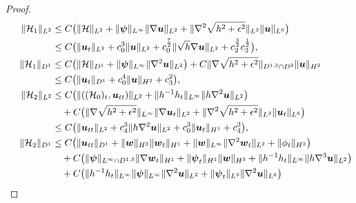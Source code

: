\documentclass[11pt,reqno]{amsart}
\numberwithin{rk}{section}
\numberwithin{prop}{section}
\numberwithin{mydef}{section}
\numberwithin{lem}{section}
\numberwithin{equation}{section}
\numberwithin{thm}{section}
\begin{document}
\begin{proof}
\begin{align}
&\hspace{5.5mm}\begin{aligned}
\|\mathcal{H}_1\|_{L^2}&\leq  C\big(\|\mathcal{H}\|_{L^2}+\|\boldsymbol{\psi}\|_{L^\infty} \|\nabla \boldsymbol{u}\|_{L^2}
+\|\nabla^2 \sqrt{h^2+\epsilon^2}\|_{L^3} 
\|\boldsymbol{u}\|_{L^6}\big)\notag\\
& \leq  C\big(\|\boldsymbol{u}_t\|_{L^2}+c_0^{3}\| \boldsymbol{u}\|_{L^2}+ c_0^{\frac{7}{2}}\|\sqrt{h}\nabla \boldsymbol{u}\|_{L^2}+c_2^{\frac{3}{2}}c_3^{\frac{1}{2}}\big),\notag
\end{aligned}\\
&\hspace{5mm}\begin{aligned}
\|\mathcal{H}_1\|_{D^1}
&\leq  C\big(\|\mathcal{H}\|_{D^1} +\|\boldsymbol{\psi}\|_{L^\infty} \|\nabla^2 \boldsymbol{u}\|_{L^2}\big)  +C \|\nabla \sqrt{h^2+\epsilon^2}\|_{D^{1,3}\cap D^2} \|\boldsymbol{u}\|_{H^2} \notag\\
&\leq C\big(\|\boldsymbol{u}_t\|_{D^1}+c^4_0\| \boldsymbol{u}\|_{H^2}+c_3^2\big),\notag
\end{aligned}\\
&\hspace{5.5mm}\begin{aligned}
\|\mathcal{H}_2\|_{L^2}&\leq  C\big(\|((\mathcal{H}_0)_t,\boldsymbol{u}_{tt})\|_{L^2}  +\|h^{-1}h_t\|_{L^\infty}\|h\nabla^2\boldsymbol{u}\|_{L^2}\big)\notag\\
&\quad +C\big(\|\nabla\sqrt{h^2+\epsilon^2}\|_{L^\infty} \|\nabla \boldsymbol{u}_t\|_{L^2}+\|\nabla^2 \sqrt{h^2+\epsilon^2}\|_{L^3} \|\boldsymbol{u}_t\|_{L^{6}}\big)\notag\\
&\leq   C\big(\|\boldsymbol{u}_{tt}\|_{L^2}+c^3_4\|h\nabla^2\boldsymbol{u}\|_{L^2}+c^3_0\| \boldsymbol{u}_t\|_{H^1}+c^3_4\big),\notag    
\end{aligned}\\
&\hspace{5mm}\begin{aligned}
\|\mathcal{H}_2\|_{D^1}
&\leq  C\big(\|\boldsymbol{u}_{tt}\|_{D^1 }+\|\boldsymbol{w}\|_{H^3}\| \boldsymbol{w}_t\|_{H^1}+\|\boldsymbol{w}\|_{L^\infty}\|\nabla^2 \boldsymbol{w}_t\|_{L^2}+ \| \phi_t\|_{H^2}\big)\notag\\
&\quad +C\big(\|\boldsymbol{\psi}\|_{L^\infty \cap  D^{1,3}}\|\nabla \boldsymbol{w}_t\|_{H^1}+\|\boldsymbol{\psi}_t\|_{H^1}\| \boldsymbol{w}\|_{H^3}+\|h^{-1}h_t\|_{L^\infty}  \|h\nabla^3 \boldsymbol{u}\|_{L^2}\big)\notag\\
&\quad +C\big(\|h^{-1}h_t\|_{L^\infty}  \|\boldsymbol{\psi}\|_{L^\infty}\|\nabla^2 \boldsymbol{u}\|_{L^2}+\|\boldsymbol{\psi}_t\|_{L^3}\|\nabla^2 \boldsymbol{u}\|_{L^6}\big)\notag\\

\end{aligned}
\end{align}
\end{proof}
\end{document}
